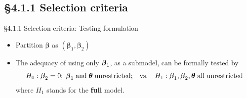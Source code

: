 \documentclass{beamer}
\newcommand{\currentsubsection}{}
\let\oldsubsection\subsection
\renewcommand{\subsection}[1]{\oldsubsection{#1}\renewcommand{\currentsubsection}{#1}}
\begin{document}
\subsection{\S4.1.1 Selection criteria} \label{sec:4.4.1}
\begin{frame}{\S4.1.1 Selection criteria: Testing formulation }
\begin{itemize}
\item Partition ${\boldsymbol \beta}$ as $({\boldsymbol \beta}_1 , {\boldsymbol \beta}_2)$



\item

The adequacy
of using only $\mbox{\boldmath $\beta$}_1$, as a submodel,  can be formally tested by
$$H_0: \mbox{\boldmath $\beta$}_2=0; \; 
\mbox{\boldmath $\beta$}_1 \; \mbox{and} \; \mbox{\boldmath $\theta$}\;
\mbox{unrestricted;}\quad \mbox{vs.}  \quad H_1: \mbox{\boldmath $\beta$}_1, \mbox{\boldmath $\beta$}_2,
\mbox{\boldmath $\theta$}\; \mbox{all unrestricted}$$
where $H_1$ stands for the \textbf{full} model. 
\end{itemize}
\end{frame}
\end{document}
